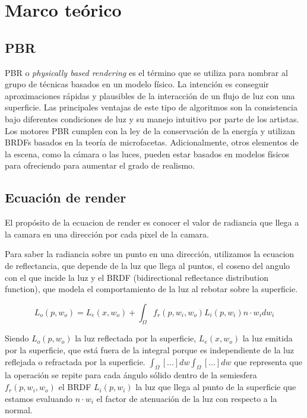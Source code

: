 \chapter{Marco te\'orico}

\section{PBR}
PBR o \textit{physically based rendering} es el t\'ermino que se utiliza para nombrar al grupo de t\'ecnicas basados en un
modelo f\'isico. La intenci\'on es conseguir aproximaciones r\'apidas y plausibles de la interacci\'on de un flujo de luz
con una superficie. Las principales ventajas de este tipo de algoritmos son la consistencia bajo diferentes condiciones de
luz y su manejo intuitivo por parte de los artistas.
Los motores PBR cumplen con la ley de la conservaci\'on de la energ\'ia y utilizan BRDFs basados en la teor\'ia de
microfacetas. Adicionalmente, otros elementos de la escena, como la c\'amara o las luces, pueden estar basados en modelos
f\'isicos para ofreciendo para aumentar el grado de realismo.

\section{Ecuaci\'on de render}
El prop\'osito de la ecuacion de render es conocer el valor de radiancia que llega a la camara en una direcci\'on
por cada pixel  de la camara.

Para saber la radiancia sobre un punto en una direcci\'on, utilizamos la ecuacion de reflectancia, que depende
de la luz que llega al puntos, el coseno del angulo con el que incide la luz y el BRDF (bidirectional reflectance
distribution function), que modela el comportamiento de la luz al rebotar sobre la superficie.

\begin{equation}
L_o(p, w_o) = L_e(x, w_o) + \int_\Omega{f_r(p, w_i, w_o) L_i(p, w_i) n\cdot{w_i}dw_i}
\end{equation}


Siendo $L_o(p, w_o)$ la luz reflectada por la superficie, $L_e(x, w_o)$ la luz emitida por la superficie, que est\'a fuera
de la integral porque es independiente de la luz reflejada o refractada por la superficie. $\int_{\Omega}[...]dw\int_{\Omega}
[...]dw$ que representa que la operaci\'on se repite para cada \'angulo s\'olido dentro de la semiesfera $f_r(p, w_i, w_o)$ el
BRDF $L_i(p, w_i)$ la luz que llega al punto de la superficie que estamos evaluando $n\cdot{w_i}$ el factor de atenuaci\'on
de la luz con respecto a la normal.


